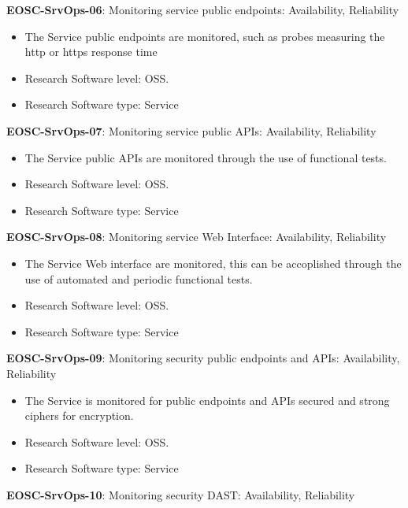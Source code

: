\textbf{EOSC-SrvOps-06}: Monitoring service public endpoints: Availability, Reliability

\begin{itemize}
    \item The Service public endpoints are monitored, such as probes measuring the http or https response time~\cite{orviz_fernandez_eosc-synergy_2020}
    \item Research Software level: OSS.
    \item Research Software type: Service
\end{itemize}

\textbf{EOSC-SrvOps-07}: Monitoring service public APIs: Availability, Reliability

\begin{itemize}
    \item The Service public APIs are monitored through the use of functional tests.~\cite{orviz_fernandez_eosc-synergy_2020}
    \item Research Software level: OSS.
    \item Research Software type: Service
\end{itemize}

\textbf{EOSC-SrvOps-08}: Monitoring service Web Interface: Availability, Reliability

\begin{itemize}
    \item The Service Web interface are monitored, this can be accoplished through the use of automated and periodic functional tests.~\cite{orviz_fernandez_eosc-synergy_2020}
    \item Research Software level: OSS.
    \item Research Software type: Service
\end{itemize}

\textbf{EOSC-SrvOps-09}: Monitoring security public endpoints and APIs: Availability, Reliability

\begin{itemize}
    \item The Service is monitored for public endpoints and APIs secured and strong ciphers for encryption.~\cite{orviz_fernandez_eosc-synergy_2020}
    \item Research Software level: OSS.
    \item Research Software type: Service
\end{itemize}

\textbf{EOSC-SrvOps-10}: Monitoring security DAST: Availability, Reliability

